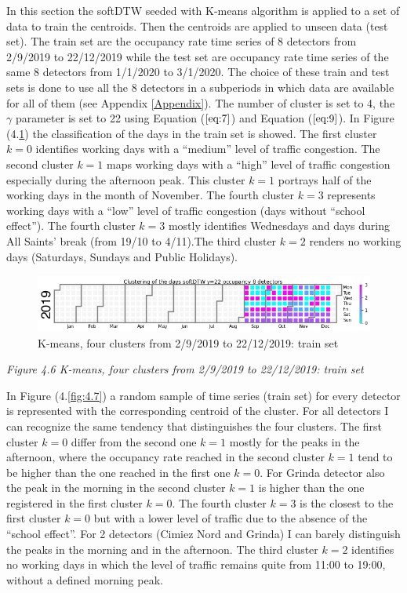 \documentclass[11pt]{article}
\begin{document}
    In this section the softDTW seeded with K-means algorithm is applied to
a set of data to train the centroids. Then the centroids are applied to
unseen data (test set). The train set are the occupancy rate time series
of 8 detectors from 2/9/2019 to 22/12/2019 while the test set are
occupancy rate time series of the same 8 detectors from 1/1/2020 to
3/1/2020. The choice of these train and test sets is done to use all the
8 detectors in a subperiods in which data are available for all of them
(see Appendix \ref{Appendix}). The number of cluster is set to 4, the
\(\gamma\) parameter is set to 22 using Equation (\(\ref{eq:7}\)) and
Equation (\(\ref{eq:9}\)). In Figure (4.\ref{fig:4.6}) the
classification of the days in the train set is showed. The first cluster
\(k=0\) identifies working days with a ``medium'' level of traffic
congestion. The second cluster \(k=1\) maps working days with a ``high''
level of traffic congestion especially during the afternoon peak. This
cluster \(k=1\) portrays half of the working days in the month of
November. The fourth cluster \(k=3\) represents working days with a
``low'' level of traffic congestion (days without ``school effect'').
The fourth cluster \(k=3\) mostly identifies Wednesdays and days during
All Saints' break (from 19/10 to 4/11).The third cluster \(k=2\) renders
no working days (Saturdays, Sundays and Public Holidays).

    \begin{figure}
    \centering
    \includegraphics{softDTW K=4 sem2 2019 train.png}
    \caption{K-means, four clusters from 2/9/2019 to 22/12/2019: train set}
    \label{fig:4.6}
\end{figure}

\emph{\small Figure 4.6  K-means, four clusters from 2/9/2019 to 22/12/2019: train set}

    In Figure (4.\ref{fig:4.7}) a random sample of time series (train set)
for every detector is represented with the corresponding centroid of the
cluster. For all detectors I can recognize the same tendency that
distinguishes the four clusters. The first cluster \(k=0\) differ from
the second one \(k=1\) mostly for the peaks in the afternoon, where the
occupancy rate reached in the second cluster \(k=1\) tend to be higher
than the one reached in the first one \(k=0\). For Grinda detector also
the peak in the morning in the second cluster \(k=1\) is higher than the
one registered in the first cluster \(k=0\). The fourth cluster \(k=3\)
is the closest to the first cluster \(k=0\) but with a lower level of
traffic due to the absence of the ``school effect''. For 2 detectors
(Cimiez Nord and Grinda) I can barely distinguish the peaks in the
morning and in the afternoon. The third cluster \(k=2\) identifies no
working days in which the level of traffic remains quite from 11:00 to
19:00, without a defined morning peak.
\end{document}
